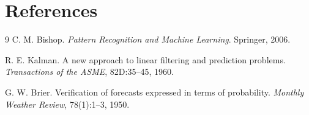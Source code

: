 \documentclass[11pt]{article}
\begin{document}
\section{References}
\begin{thebibliography}{9}
C. M. Bishop.
\newblock \emph{Pattern Recognition and Machine Learning}.
\newblock Springer, 2006.

R. E. Kalman.
\newblock A new approach to linear filtering and prediction problems.
\newblock \emph{Transactions of the ASME}, 82D:35--45, 1960.

G. W. Brier.
\newblock Verification of forecasts expressed in terms of probability.
\newblock \emph{Monthly Weather Review}, 78(1):1--3, 1950.
\end{thebibliography}
\end{document}
